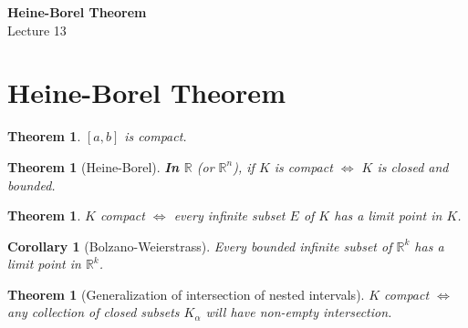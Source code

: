 \documentclass[12pt]{article}
\newcommand{\RR}{\mathbb{R}}   %
\theoremstyle{definition}
\theoremstyle{plain}
\newtheorem{theorem}[definition]{Theorem}
\newtheorem{corollary}[definition]{Corollary}
\begin{document}

\begin{center}
    {\Large \textbf{Heine-Borel Theorem}}\\[0.5em]
    {\large Lecture 13}
\end{center}

\tableofcontents

\newpage

\section{Heine-Borel Theorem}
\begin{theorem}
$[a,b]$ is compact.
\end{theorem}

\begin{theorem}[Heine-Borel]
\textbf{In $\RR$} (or $\RR^n$), if $K$ is compact $\iff$ $K$ is closed and bounded.
\end{theorem}

\begin{theorem}
$K$ compact $\iff$ every infinite subset $E$ of $K$ has a limit point in $K$.
\end{theorem}

\begin{corollary}[Bolzano-Weierstrass]
Every bounded infinite subset of $\RR^k$ has a limit point in $\RR^k$.
\end{corollary}

\begin{theorem}[Generalization of intersection of nested intervals]
$K$ compact $\iff$ any collection of closed subsets $K_{\alpha}$ will have non-empty intersection.
\end{theorem}
\end{document}
